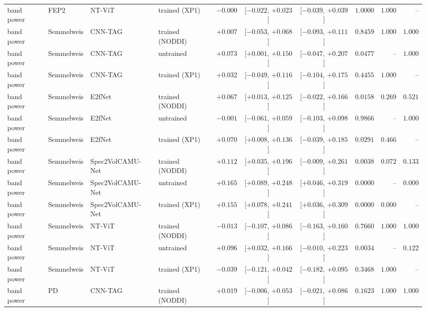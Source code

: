 \documentclass[10pt]{article}
\begin{document}
\begin{longtable}{l l l l r c c r r r}
        band power & FEP2 & NT-ViT & trained (XP1) & $-0.000$ & [$-0.022$, $+0.023$] & [$-0.039$, $+0.039$] & $1.0000$ & $1.000$ & -- \\
        band power & Semmelweis & CNN-TAG & trained (NODDI) & $+0.007$ & [$-0.053$, $+0.068$] & [$-0.093$, $+0.111$] & $0.8459$ & $1.000$ & $1.000$ \\
        band power & Semmelweis & CNN-TAG & untrained & $+0.073$ & [$+0.001$, $+0.150$] & [$-0.047$, $+0.207$] & $0.0477$ & -- & $1.000$ \\
        band power & Semmelweis & CNN-TAG & trained (XP1) & $+0.032$ & [$-0.049$, $+0.116$] & [$-0.104$, $+0.175$] & $0.4455$ & $1.000$ & -- \\
        band power & Semmelweis & E2fNet & trained (NODDI) & $+0.067$ & [$+0.013$, $+0.125$] & [$-0.022$, $+0.166$] & $0.0158$ & $0.269$ & $0.521$ \\
        band power & Semmelweis & E2fNet & untrained & $-0.001$ & [$-0.061$, $+0.059$] & [$-0.103$, $+0.098$] & $0.9866$ & -- & $1.000$ \\
        band power & Semmelweis & E2fNet & trained (XP1) & $+0.070$ & [$+0.008$, $+0.136$] & [$-0.039$, $+0.185$] & $0.0291$ & $0.466$ & -- \\
        band power & Semmelweis & Spec2VolCAMU-Net & trained (NODDI) & $+0.112$ & [$+0.035$, $+0.196$] & [$-0.009$, $+0.261$] & $0.0038$ & $0.072$ & $0.133$ \\
        band power & Semmelweis & Spec2VolCAMU-Net & untrained & $+0.165$ & [$+0.089$, $+0.248$] & [$+0.046$, $+0.319$] & $0.0000$ & -- & $0.000$ \\
        band power & Semmelweis & Spec2VolCAMU-Net & trained (XP1) & $+0.155$ & [$+0.078$, $+0.241$] & [$+0.036$, $+0.309$] & $0.0000$ & $0.000$ & -- \\
        band power & Semmelweis & NT-ViT & trained (NODDI) & $-0.013$ & [$-0.107$, $+0.086$] & [$-0.163$, $+0.160$] & $0.7660$ & $1.000$ & $1.000$ \\
        band power & Semmelweis & NT-ViT & untrained & $+0.096$ & [$+0.032$, $+0.166$] & [$-0.010$, $+0.223$] & $0.0034$ & -- & $0.122$ \\
        band power & Semmelweis & NT-ViT & trained (XP1) & $-0.039$ & [$-0.121$, $+0.042$] & [$-0.182$, $+0.095$] & $0.3468$ & $1.000$ & -- \\
        band power & PD & CNN-TAG & trained (NODDI) & $+0.019$ & [$-0.006$, $+0.053$] & [$-0.021$, $+0.086$] & $0.1623$ & $1.000$ & $1.000$ \\

\end{longtable}
\end{document}
